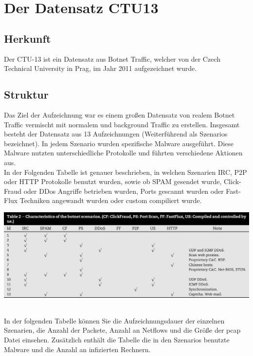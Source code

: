 \documentclass[main.tex]{subfiles}
\begin{document}
\author{Philipp Nickel}
\section{Der Datensatz CTU13}
\subsection{Herkunft}
Der CTU-13 ist ein Datensatz aus Botnet Traffic, welcher von der Czech Technical University in Prag, im Jahr 2011 aufgezeichnet wurde. 
\subsection{Struktur}
Das Ziel der Aufzeichnung war es einem großen Datensatz von realem Botnet Traffic vermischt mit normalem und background Traffic zu erstellen. Insgesamt besteht der Datensatz aus 13 Aufzeichnungen (Weiterführend als Szenarios bezeichnet). In jedem Szenario wurden spezifische Malware ausgeführt. Diese Malware nutzten unterschiedliche Protokolle und führten verschiedene Aktionen aus.  \\
In der Folgenden Tabelle ist genauer beschrieben, in welchen Szenarien IRC, P2P oder HTTP Protokolle benutzt wurden, sowie ob SPAM gesendet wurde, Click-Fraud oder DDos Angriffe betrieben wurden, Ports gescannt wurden oder Fast-Flux Techniken angewandt wurden oder custom compiliert wurde.\\
\begin{center}
\includegraphics[scale=1]{images/CTU_Tabelle_1.jpg} 
\label{Tabelle: Charakteristika der Szenarien}
\end{center}
\\
In der folgenden Tabelle können Sie die Aufzeichnungsdauer der einzelnen Szenarien, die Anzahl der Packete, Anzahl an Netflows und die Größe der pcap Datei einsehen. Zusätzlich enthält die Tabelle die in den Szenarios benutzte Malware und die Anzahl an infizierten Rechnern.  
\end{document}
